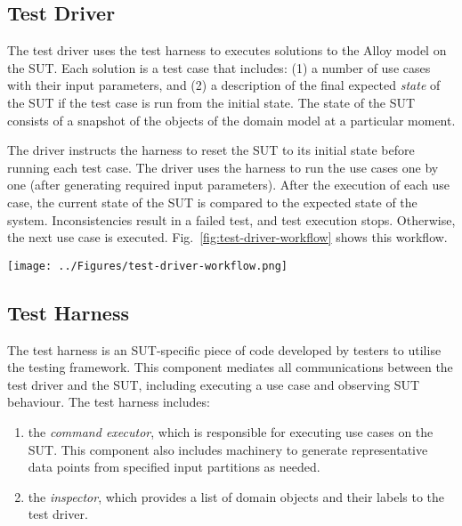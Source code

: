
\subsection{Test Driver}
\label{sec:framework-overview-test-driver}
The test driver uses the test harness to executes solutions to the Alloy model on the SUT.
Each solution is a test case that includes: (1) a number of use cases with their input parameters,
and (2) a description of the final expected \textit{state} of the SUT if the test case is run from the initial state.
The state of the SUT consists of a snapshot of the objects of the domain model at a particular moment. 

The driver instructs the harness to reset the SUT to its initial state before running each test case.
The driver uses the harness to run the use cases one by one (after generating required input parameters).
After the execution of each use case, the current state of the SUT is compared to the expected state of the system. 
Inconsistencies result in a failed test, and test execution stops. Otherwise, the next use case is executed.
Fig.~\ref{fig:test-driver-workflow} shows this workflow.

\begin{figure*}[!t]
\centering
\texttt{[image: ../Figures/test-driver-workflow.png]}
\caption{The workflow of the test driver.}
\label{fig:test-driver-workflow}
\end{figure*}

\subsection{Test Harness}
\label{sec:framework-overview-test-harness}
The test harness is an SUT-specific piece of code developed by testers to utilise the testing framework. This component mediates all communications between the test driver and the SUT, including executing a use case and observing SUT behaviour. The test harness includes: 
\begin{enumerate}
	\item the \textit{command executor}, which is responsible for executing use cases on the SUT.  This component also includes machinery to generate representative data points from specified input partitions as needed. 
	
	\item the \textit{inspector}, which provides a list of domain objects and their labels to the test driver.
\end{enumerate}